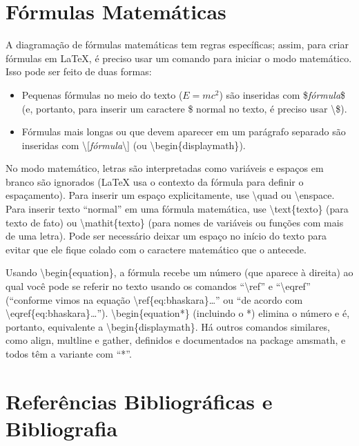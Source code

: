 \section{Fórmulas Matemáticas}

A diagramação de fórmulas matemáticas tem regras específicas; assim, para
criar fórmulas em \LaTeX{}, é preciso usar um comando para iniciar o modo
matemático. Isso pode ser feito de duas formas:

\begin{itemize}
  \item Pequenas fórmulas no meio do texto ($E=mc^2$) são inseridas com
  \textsf{\$\textit{fórmula}\$} (e, portanto, para inserir um caractere \$
  normal no texto, é preciso usar \textsf{\textbackslash{}\$}).

  \item Fórmulas mais longas ou que devem aparecer em um parágrafo
  separado são inseridas com
  \textsf{\textbackslash{}[\textit{fórmula}\textbackslash{}]} (ou
  \textsf{\textbackslash{}begin\{displaymath\}}).
\end{itemize}

No modo matemático, letras são interpretadas como variáveis e espaços
em branco são ignorados (\LaTeX{} usa o contexto da fórmula para
definir o espaçamento). Para inserir um espaço explicitamente, use
\textsf{\textbackslash{}quad} ou \textsf{\textbackslash{}enspace}.
Para inserir texto ``normal'' em uma fórmula matemática, use
\textsf{\textbackslash{}text\{texto\}} (para texto de fato) ou
\textsf{\textbackslash{}mathit\{texto\}} (para nomes de variáveis
ou funções com mais de uma letra). Pode ser necessário deixar um
espaço no início do texto para evitar que ele fique colado com o
caractere matemático que o antecede.

Usando \textsf{\textbackslash{}begin\{equation\}}, a fórmula recebe um
número (que aparece à direita) ao qual você pode se referir no texto
usando os comandos ``\textsf{\textbackslash{}ref}'' e
``\textsf{\textbackslash{}eqref}'' (``\textsf{conforme vimos na equação
\textbackslash{}ref\{eq:bhaskara\}\ldots}'' ou
``\textsf{de acordo com \textbackslash{}eqref\{eq:bhaskara\}\ldots}'').
\textsf{\textbackslash{}begin\{equation*\}} (incluindo o *) elimina
o número e é, portanto, equivalente a
\textsf{\textbackslash{}begin\{displaymath\}}. Há outros comandos
similares, como \textsf{align}, \textsf{multline} e \textsf{gather},
definidos e documentados na package \textsf{amsmath}, e todos têm
a variante com ``*''.

\section{Referências Bibliográficas e Bibliografia}

